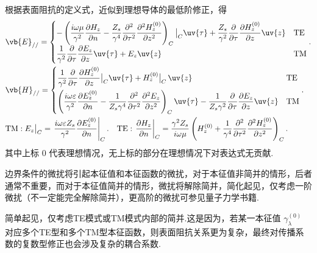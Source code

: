 根据表面阻抗的定义式，近似到理想导体的最低阶修正，得
\begin{align*}
	&\vb{E}_{//} = \begin{cases}
		-\left( \dfrac{i\omega\mu}{\gamma^2} \dfrac{\partial H_z}{\partial n} - \dfrac{Z_s}{\gamma^4} \dfrac{\partial^2}{\partial{\tau}^2} \dfrac{\partial^2 H_z^{(0)}}{\partial z^2} \right)_C \big|_C \uv{\tau} + \dfrac{Z_s}{\gamma^2} \dfrac{\partial}{\partial{\tau}} \dfrac{\partial H_z^{(0)}}{\partial z} \uv{z} & \text{TE} \\[8pt]
		\dfrac{1}{\gamma^2} \dfrac{\partial}{\partial{\tau}} \dfrac{\partial E_z}{\partial z} \uv{\tau} + E_z \uv{z}                                                                                                                                                                                                     & \text{TM}
	\end{cases}.\\
	&\vb{H}_{//} = \begin{cases}
		\dfrac{1}{\gamma^2} \dfrac{\partial}{\partial{\tau}} \dfrac{\partial H_z^{(0)}}{\partial z} \big|_C \uv{\tau} + H_z^{(0)} \big|_C \,\uv{z}                                                                                                                                                                    & \text{TE} \\[8pt]
		\left( \dfrac{i\omega\varepsilon}{\gamma^2} \dfrac{\partial E_z^{(0)}}{\partial n} - \dfrac{1}{Z_s \gamma^4} \dfrac{\partial^2}{\partial{\tau}^2} \dfrac{\partial^2 E_z}{\partial z^2} \right)_C \uv{\tau} - \dfrac{1}{Z_s \gamma^2} \dfrac{\partial}{\partial{\tau}} \dfrac{\partial E_z}{\partial z} \uv{z} & \text{TM}
	\end{cases}.\\
	&\text{TM} : E_z \big|_C = \left. \dfrac{i\omega\varepsilon Z_s}{\gamma^2} \dfrac{\partial E_z^{(0)}}{\partial n} \right|_C. \quad \text{TE} : \left. \dfrac{\partial H_z}{\partial n} \right|_C = \dfrac{\gamma^2 Z_s}{i\omega\mu} \left( H_z^{(0)} + \dfrac{1}{\gamma^4} \dfrac{\partial^2}{\partial{\tau}^2} \dfrac{\partial^2 H_z^{(0)}}{\partial z^2} \right)_C.
\end{align*}
其中上标 \(0\) 代表理想情况，无上标的部分在理想情况下对表达式无贡献.

边界条件的微扰将引起本征值和本征函数的微扰，对于本征值非简并的情形，后者通常不重要，而对于本征值简并的情形，微扰将解除简并，简化起见，仅考虑一阶微扰（不一定能完全解除简并），更高阶的微扰可参见量子力学书籍.

简单起见，仅考虑TE模式或TM模式内部的简并.这是因为，若某一本征值 \(\gamma_{\lambda}^{(0)}\) 对应多个TE型和多个TM型本征函数，则表面阻抗关系更为复杂，最终对传播系数的复数型修正也会涉及复杂的耦合系数.

